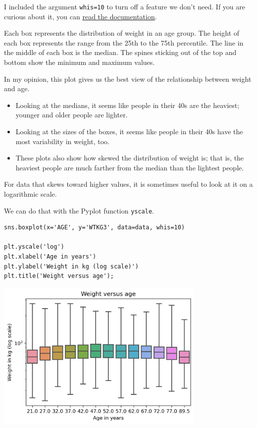 I included the argument \passthrough{\lstinline!whis=10!} to turn off a
feature we don't need. If you are curious about it, you can
\href{https://seaborn.pydata.org/generated/seaborn.boxplot.html}{read
the documentation}.

Each box represents the distribution of weight in an age group. The
height of each box represents the range from the 25th to the 75th
percentile. The line in the middle of each box is the median. The spines
sticking out of the top and bottom show the minimum and maximum values.

In my opinion, this plot gives us the best view of the relationship
between weight and age.

\begin{itemize}
\item
  Looking at the medians, it seems like people in their 40s are the
  heaviest; younger and older people are lighter.
\item
  Looking at the sizes of the boxes, it seems like people in their 40s
  have the most variability in weight, too.
\item
  These plots also show how skewed the distribution of weight is; that
  is, the heaviest people are much farther from the median than the
  lightest people.
\end{itemize}

For data that skews toward higher values, it is sometimes useful to look
at it on a logarithmic scale.

We can do that with the Pyplot function
\passthrough{\lstinline!yscale!}.

\begin{lstlisting}[]
sns.boxplot(x='AGE', y='WTKG3', data=data, whis=10)

plt.yscale('log')
plt.xlabel('Age in years')
plt.ylabel('Weight in kg (log scale)')
plt.title('Weight versus age');
\end{lstlisting}

\begin{center}
\includegraphics[width=4in]{chapters/09_relationships_files/09_relationships_47_0.png}
\end{center}

